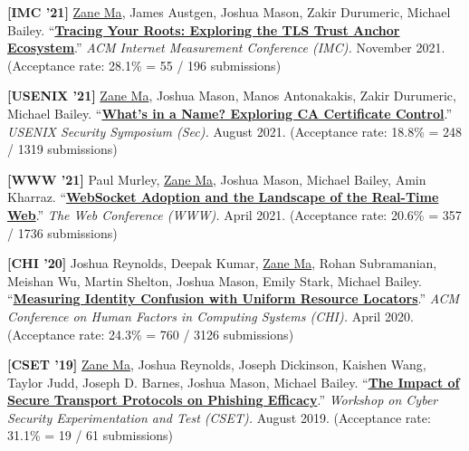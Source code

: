 \documentclass[10pt,singlecolumn]{article} %
\begin{document}
\begin{etaremune}
\item \textbf{[IMC '21]} 
\underline{Zane Ma}, James Austgen, Joshua Mason, Zakir Durumeric, Michael Bailey.
``\textbf{\href{https://zanema.com/papers/imc21_roots.pdf}{Tracing Your Roots: Exploring the TLS Trust Anchor Ecosystem}}.''
\emph{ACM Internet Measurement Conference (IMC).} November 2021.
(Acceptance rate: 28.1\% = 55 / 196 submissions)
\vspace{6pt}


\item \textbf{[USENIX '21]}
\underline{Zane Ma}, Joshua Mason, Manos Antonakakis, Zakir Durumeric, Michael Bailey.
``\textbf{\href{https://zanema.com/papers/usenix21_ca_operators.pdf}{What's in a Name? Exploring CA Certificate Control}}.''
\emph{USENIX Security Symposium (Sec).} August 2021.
(Acceptance rate: 18.8\% = 248 / 1319 submissions)  
\vspace{6pt}


\item \textbf{[WWW '21]}
Paul Murley, \underline{Zane Ma}, Joshua Mason, Michael Bailey, Amin Kharraz.
``\textbf{\href{https://zanema.com/papers/www21_websockets.pdf}{WebSocket Adoption and the Landscape of the Real-Time Web}}.''
\emph{The Web Conference (WWW).} April 2021.
(Acceptance rate: 20.6\% = 357 / 1736 submissions)
\vspace{6pt}


\item \textbf{[CHI '20]}
Joshua Reynolds, Deepak Kumar, \underline{Zane Ma}, Rohan Subramanian, Meishan Wu, Martin Shelton, Joshua Mason, Emily Stark, Michael Bailey.
``\textbf{\href{https://zanema.com/papers/chi20_urlconfusion.pdf}{Measuring Identity Confusion with Uniform Resource Locators}}.''
\emph{ACM Conference on Human Factors in Computing Systems (CHI).} April 2020.
(Acceptance rate: 24.3\% = 760 / 3126 submissions)
\vspace{6pt}


\item \textbf{[CSET '19]}
\underline{Zane Ma}, Joshua Reynolds, Joseph Dickinson, Kaishen Wang, Taylor Judd, Joseph D. Barnes, Joshua Mason, Michael Bailey.
``\textbf{\href{https://zanema.com/papers/cset19_httpsphishing.pdf}{The Impact of Secure Transport Protocols on Phishing Efficacy}}.''
\emph{Workshop on Cyber Security Experimentation and Test (CSET).} August 2019.
(Acceptance rate: 31.1\% = 19 / 61 submissions)
\vspace{6pt}


\end{etaremune}
\end{document}
